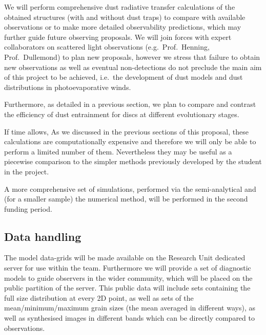 \documentclass[10pt,fleqn,twoside]{article}
\begin{document}
We will perform comprehensive dust radiative transfer calculations of
the obtained structures (with and without dust traps) to compare with
available observations or to make more detailed observability
predictions, which may further guide future observing proposals. We
will join forces with expert collaborators on scattered light
observations (e.g.\ Prof.\ Henning, 
Prof.\ Dullemond) to
plan new proposals, however we stress that failure to obtain new
observations as well as eventual non-detections do not preclude the
main aim of this project to be achieved, i.e.\ the development
of dust models and dust distributions in photoevaporative winds. 

Furthermore, as detailed in a previous section, we plan to compare and contrast
the efficiency of dust entrainment for discs at different evolutionary
stages. 

If time allows,  As we discussed in the previous sections of this
proposal, these calculations are computationally expensive
and therefore we will only be able to perform a limited number of
them. Nevertheless they may be useful as a piecewise comparison to
the simpler methods previously developed by the student in the project.  

A more comprehensive set of simulations, performed via the
semi-analytical and (for a smaller sample) the numerical method, will be
performed in the second funding period. 

 
\vspace{0.5em}


\subsection{Data handling}

The model data-grids will be made available on the Research Unit
dedicated server for use within the team. Furthermore we will provide
a set of diagnostic models to guide observers in the wider community,
which will be placed 
on the public partition of the server.
This public data will include sets containing the full size
distribution at every 2D point, as well as sets of the
mean/minimum/maximum grain sizes (the mean averaged in different
ways), as well as synthesised images in different bands which can be
directly compared to observations. 
\end{document}

